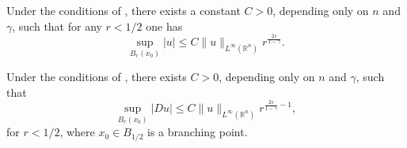 \documentclass[10pt,a4paper]{amsart}
\newcommand{\R}{\mathbb{R}}
\begin{document}
\begin{corollary}\label{c4.1}
     Under the conditions of , there exists a constant $C>0$, depending only on $n$ and $\gamma$, such that for any $r<1/2$ one has
    $$
     \sup_{B_r(x_0)}|u|\leq  C\|u\|_{L^\infty(\R^n)}r^{\frac{2s}{1-\gamma}}.
    $$   
\end{corollary}

\begin{theorem}
Under the conditions of , there exists $C>0$, depending only on $n$ and $\gamma$, such that
\begin{equation}\label{gradientestimate}
    \sup_{B_r(x_0)}|Du|\le C\|u\|_{L^\infty(\R^n)}r^{\frac{2s}{1-\gamma}-1},
\end{equation}
for $r<1/2$, where $x_0\in B_{1/2}$ is a branching point.
\end{theorem}
\end{document}
